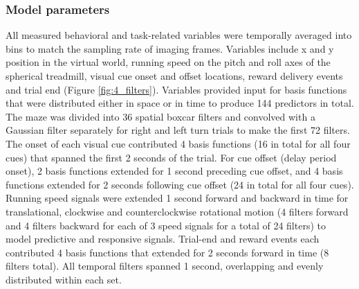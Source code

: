 \subsubsection{Model parameters}\label{methods:model_param}
All measured behavioral and task-related variables were temporally averaged into bins to match the sampling rate of imaging frames. Variables include x and y position in the virtual world, running speed on the pitch and roll axes of the spherical treadmill, visual cue onset and offset locations, reward delivery events and trial end (Figure \ref{fig:4_filters}). Variables provided input for basis functions that were distributed either in space or in time to produce 144 predictors in total. The maze was divided into 36 spatial boxcar filters and convolved with a Gaussian filter separately for right and left turn trials to make the first 72 filters. The onset of each visual cue contributed 4 basis functions (16 in total for all four cues) that spanned the first 2 seconds of the trial. For cue offset (delay period onset), 2 basis functions extended for 1 second preceding cue offset, and 4 basis functions extended for 2 seconds following cue offset (24 in total for all four cues). Running speed signals were extended 1 second forward and backward in time for translational, clockwise and counterclockwise rotational motion (4 filters forward and 4 filters backward for each of 3 speed signals for a total of 24 filters) to model predictive and responsive signals. Trial-end and reward events each contributed 4 basis functions that extended for 2 seconds forward in time (8 filters total). All temporal filters spanned 1 second, overlapping and evenly distributed within each set.

